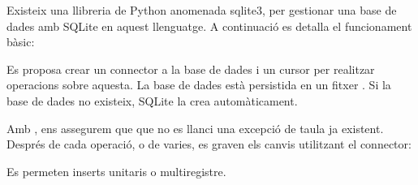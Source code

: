 \documentclass[letterpaper,11pt,catalan]{sphinxmanual}
\begin{document}
Existeix una llibreria de Python anomenada sqlite3, per gestionar una base
de dades amb SQLite en aquest llenguatge. A continuació es detalla el funcionament
bàsic:

Es proposa crear un connector a la base de dades i un cursor per realitzar
operacions sobre aquesta. La base de dades està persistida en un fitxer .
Si la base de dades no existeix, SQLite la crea automàticament.

\begin{sphinxVerbatim}[commandchars=\\\{\}]
 
  
  
\end{sphinxVerbatim}


\begin{sphinxVerbatim}[commandchars=\\\{\}]
\end{sphinxVerbatim}

Amb , ens assegurem que que no es llanci una excepció de taula
ja existent. Després de cada operació, o de varies, es graven els canvis utilitzant
el connector:

\begin{sphinxVerbatim}[commandchars=\\\{\}]
\end{sphinxVerbatim}

 Es permeten inserts unitaris o multiregistre.

\begin{sphinxVerbatim}[commandchars=\\\{\}]
  \PYG{p}{[}\PYG{p}{]}
\end{sphinxVerbatim}
\end{document}
